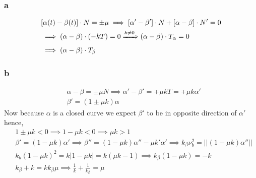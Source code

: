 \documentclass[
	12pt, %
]{fphw}
\theoremstyle{plain}
\begin{document}
\subsubsection*{a}
\begin{align*}
&[\alpha(t) - \beta(t)]\cdot N = \pm\mu \implies [\alpha'-\beta']\cdot N + [\alpha - \beta]\cdot N'=0\\
&\implies (\alpha-\beta)\cdot (-kT)=0 \xRightarrow{{k\neq0}} (\alpha-\beta)\cdot T_{\alpha}=0\\
&\implies (\alpha-\beta)\cdot T_\beta
\end{align*}
\subsubsection*{b}
\begin{align*}
&\alpha-\beta = \pm\mu N \implies \alpha'-\beta'=\mp\mu kT=\mp \mu k\alpha'\\
&\beta'=(1\pm\mu k)\alpha
\end{align*}
Now because $\alpha$ is a closed curve we expect $\beta'$ to be in opposite direction of $\alpha'$ hence,
\begin{align*}
&1\pm \mu k < 0 \implies 1-\mu k < 0 \implies \mu k > 1 \\
&\beta'=(1-\mu k)\alpha' \implies \beta'' = (1-\mu k)\alpha'' - \mu k'\alpha'
\implies k_\beta \nu_b ^2=||(1-\mu k)\alpha''||\\
&k_b(1-\mu k)^2 = k|1-\mu k| = k(\mu k-1) \implies k_\beta(1-\mu k)=-k\\
&k_\beta + k = kk_\beta \mu \implies \frac{1}{k} + \frac{1}{k_\beta} = \mu
\end{align*}
\end{document}
